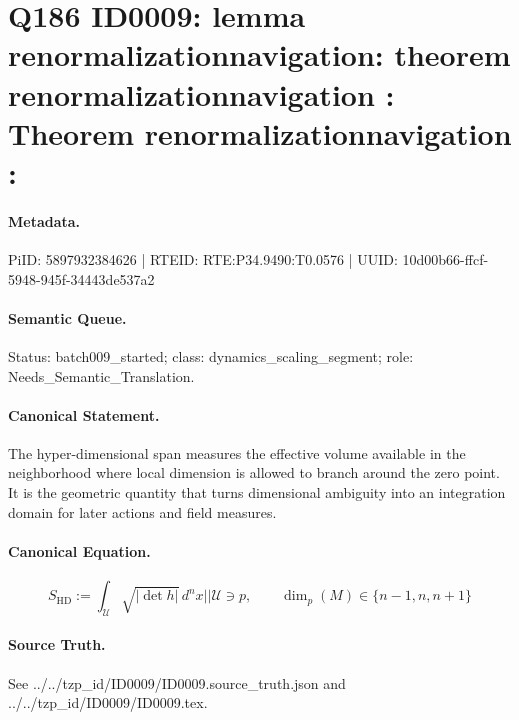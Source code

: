 \section*{Q186 ID0009: lemma renormalizationnavigation: theorem renormalizationnavigation : Theorem renormalizationnavigation :}
\paragraph{Metadata.}
PiID: 5897932384626 | RTEID: RTE:P34.9490:T0.0576 | UUID: 10d00b66-ffcf-5948-945f-34443de537a2

\paragraph{Semantic Queue.}
Status: batch009\_started; class: dynamics\_scaling\_segment; role: Needs\_Semantic\_Translation.

\paragraph{Canonical Statement.}
The hyper-dimensional span measures the effective volume available in the neighborhood where local dimension is allowed to branch around the zero point. It is the geometric quantity that turns dimensional ambiguity into an integration domain for later actions and field measures.

\paragraph{Canonical Equation.}
\[
S_{\mathrm{HD}} := \int_{\mathcal U} \sqrt{\lvert \det h \rvert}\, d^{n}x || \mathcal U \ni p, \qquad \dim_{p}(M)\in\{n-1,n,n+1\}
\]

\paragraph{Source Truth.}
See ../../tzp\_id/ID0009/ID0009.source\_truth.json and ../../tzp\_id/ID0009/ID0009.tex.
